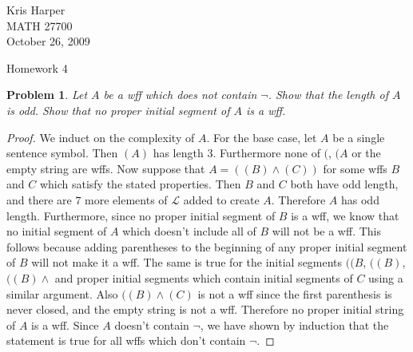 \documentclass{article}
\newtheorem{problem}{Problem}
\begin{document}
\begin{flushright}
Kris Harper\\

MATH 27700\\

October 26, 2009
\end{flushright}

\begin{center}
Homework 4
\end{center}

\begin{problem}
Let $A$ be a wff which does not contain $\neg$. Show that the length of $A$ is odd. Show that no proper initial segment of $A$ is a wff.
\end{problem}
\begin{proof}
We induct on the complexity of $A$. For the base case, let $A$ be a single sentence symbol. Then $(A)$ has length $3$. Furthermore none of $($, $(A$ or the empty string are wffs. Now suppose that $A = ((B) \wedge (C))$ for some wffs $B$ and $C$ which satisfy the stated properties. Then $B$ and $C$ both have odd length, and there are $7$ more elements of $\mathcal{L}$ added to create $A$. Therefore $A$ has odd length. Furthermore, since no proper initial segment of $B$ is a wff, we know that no initial segment of $A$ which doesn't include all of $B$ will not be a wff. This follows because adding parentheses to the beginning of any proper initial segment of $B$ will not make it a wff. The same is true for the initial segments $((B$, $((B)$, $((B) \wedge$ and proper initial segments which contain initial segments of $C$ using a similar argument. Also $((B) \wedge (C)$ is not a wff since the first parenthesis is never closed, and the empty string is not a wff. Therefore no proper initial string of $A$ is a wff. Since $A$ doesn't contain $\neg$, we have shown by induction that the statement is true for all wffs which don't contain $\neg$.
\end{proof}
\end{document}
